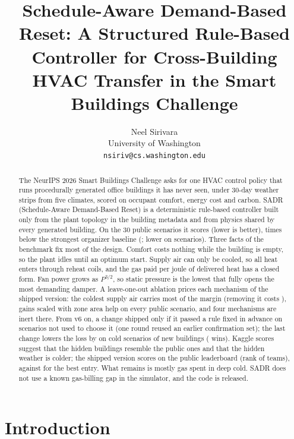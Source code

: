 \documentclass{article}
\title{Schedule-Aware Demand-Based Reset: A Structured Rule-Based Controller for Cross-Building HVAC Transfer in the Smart Buildings Challenge}
\author{%
  Neel Sirivara\\
  University of Washington\\
  \texttt{nsiriv@cs.washington.edu}
}
\begin{document}
\maketitle

\begin{abstract}
The NeurIPS 2026 Smart Buildings Challenge asks for one HVAC control policy that runs procedurally generated office buildings it has never seen, under 30-day weather strips from five climates, scored on occupant comfort, energy cost and carbon. SADR (Schedule-Aware Demand-Based Reset) is a deterministic rule-based controller built only from the plant topology in the building metadata and from physics shared by every generated building. On the 30 public scenarios it scores \RTenConfPubCand{} (lower is better), \RElvPwTimes{} times below the strongest organizer baseline (\MetricPidWater; lower on \RElvPwWins{} scenarios). Three facts of the benchmark fix most of the design. Comfort costs nothing while the building is empty, so the plant idles until an optimum start. Supply air can only be cooled, so all heat enters through reheat coils, and the gas paid per joule of delivered heat has a closed form. Fan power grows as $P^{3/2}$, so static pressure is the lowest that fully opens the most demanding damper. A leave-one-out ablation prices each mechanism of the shipped version: the coldest supply air carries most of the margin (removing it costs \RElvAbSatRel), gains scaled with zone area help on every public scenario, and four mechanisms are inert there. From v6 on, a change shipped only if it passed a rule fixed in advance on scenarios not used to choose it (one round reused an earlier confirmation set); the last change lowers the loss by \RTenConfHarshCThreeRelAbs{} on \RTenConfHarshCThreeN{} cold scenarios of \RTenNNewBuild{} new buildings (\RTenConfHarshCThreeWins{} wins). Kaggle scores suggest that the hidden buildings resemble the public ones and that the hidden weather is colder; the shipped version scores \RTenKagVTwelve{} on the public leaderboard (rank \RElvKagRank{} of \RElvKagTeams{} teams), against \RElvKagBest{} for the best entry. What remains is mostly gas spent in deep cold. SADR does not use a known gas-billing gap in the simulator, and the code is released.
\end{abstract}

\section{Introduction}
\end{document}
